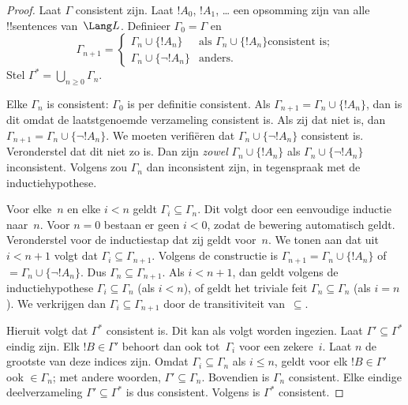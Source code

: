 \documentclass[openany]{memoir}
\begin{document}
\begin{proof}
Laat $\Gamma$ consistent zijn. Laat $!A_0$, $!A_1$, \dots{} een
opsomming zijn van alle !!{sentence}s van~$\Lang L$. Definieer
$\Gamma_0 = \Gamma$ en
\[
\Gamma_{n+1} =
\begin{cases}
\Gamma_n \cup \{ !A_n \} & \textrm{als $\Gamma_n \cup \{!A_n\}$
  consistent is;} \\
\Gamma_n \cup \{ \lnot !A_n \} & \textrm{anders.}
\end{cases}
\]
Stel $\Gamma^* = \bigcup_{n \geq 0} \Gamma_n$.

Elke $\Gamma_n$ is consistent: $\Gamma_0$ is per definitie consistent.
Als $\Gamma_{n+1} = \Gamma_n \cup \{!A_n\}$, dan is dit omdat de
laatstgenoemde verzameling consistent is. Als zij dat niet is, dan
$\Gamma_{n+1} = \Gamma_n \cup \{\lnot !A_n\}$. We moeten verifiëren dat
$\Gamma_n \cup \{\lnot !A_n\}$ consistent is. Veronderstel dat dit niet
zo is. Dan zijn \emph{zowel} $\Gamma_n \cup \{!A_n\}$ als
$\Gamma_n \cup \{\lnot !A_n\}$ inconsistent. Volgens
zou $\Gamma_n$ dan inconsistent zijn, in tegenspraak met de
inductiehypothese.

Voor elke~$n$ en elke $i < n$ geldt $\Gamma_i \subseteq \Gamma_n$. Dit
volgt door een eenvoudige inductie naar~$n$. Voor $n=0$ bestaan er geen
$i < 0$, zodat de bewering automatisch geldt. Veronderstel voor de
inductiestap dat zij geldt voor~$n$. We tonen aan dat uit $i < n+1$
volgt dat $\Gamma_i \subseteq \Gamma_{n+1}$. Volgens de constructie is
$\Gamma_{n+1} = \Gamma_n \cup \{!A_n\}$ of $= \Gamma_n \cup \{\lnot
!A_n\}$. Dus $\Gamma_n \subseteq \Gamma_{n+1}$. Als $i < n+1$, dan
geldt volgens de inductiehypothese $\Gamma_i \subseteq \Gamma_n$ (als
$i < n$), of geldt het triviale feit $\Gamma_n \subseteq \Gamma_n$ (als
$i = n$). We verkrijgen dan $\Gamma_i \subseteq \Gamma_{n+1}$ door de
transitiviteit van~$\subseteq$.

Hieruit volgt dat $\Gamma^*$ consistent is. Dit kan als volgt worden
ingezien. Laat $\Gamma' \subseteq \Gamma^*$ eindig zijn. Elk
$!B \in \Gamma'$ behoort dan ook tot~$\Gamma_i$ voor een zekere~$i$.
Laat $n$ de grootste van deze indices zijn. Omdat
$\Gamma_i \subseteq \Gamma_n$ als $i \le n$, geldt voor elk
$!B \in \Gamma'$ ook $\in \Gamma_n$; met andere woorden,
$\Gamma' \subseteq \Gamma_n$. Bovendien is $\Gamma_n$ consistent. Elke
eindige deelverzameling $\Gamma' \subseteq \Gamma^*$ is dus consistent.
Volgens  is $\Gamma^*$ consistent.


\end{proof}
\end{document}
